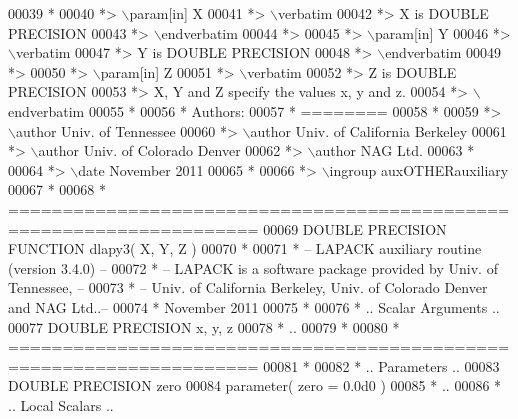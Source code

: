 \begin{DoxyCode}
00039 \textcolor{comment}{*}
00040 \textcolor{comment}{*> \(\backslash\)param[in] X}
00041 \textcolor{comment}{*> \(\backslash\)verbatim}
00042 \textcolor{comment}{*>          X is DOUBLE PRECISION}
00043 \textcolor{comment}{*> \(\backslash\)endverbatim}
00044 \textcolor{comment}{*>}
00045 \textcolor{comment}{*> \(\backslash\)param[in] Y}
00046 \textcolor{comment}{*> \(\backslash\)verbatim}
00047 \textcolor{comment}{*>          Y is DOUBLE PRECISION}
00048 \textcolor{comment}{*> \(\backslash\)endverbatim}
00049 \textcolor{comment}{*>}
00050 \textcolor{comment}{*> \(\backslash\)param[in] Z}
00051 \textcolor{comment}{*> \(\backslash\)verbatim}
00052 \textcolor{comment}{*>          Z is DOUBLE PRECISION}
00053 \textcolor{comment}{*>          X, Y and Z specify the values x, y and z.}
00054 \textcolor{comment}{*> \(\backslash\)endverbatim}
00055 \textcolor{comment}{*}
00056 \textcolor{comment}{*  Authors:}
00057 \textcolor{comment}{*  ========}
00058 \textcolor{comment}{*}
00059 \textcolor{comment}{*> \(\backslash\)author Univ. of Tennessee }
00060 \textcolor{comment}{*> \(\backslash\)author Univ. of California Berkeley }
00061 \textcolor{comment}{*> \(\backslash\)author Univ. of Colorado Denver }
00062 \textcolor{comment}{*> \(\backslash\)author NAG Ltd. }
00063 \textcolor{comment}{*}
00064 \textcolor{comment}{*> \(\backslash\)date November 2011}
00065 \textcolor{comment}{*}
00066 \textcolor{comment}{*> \(\backslash\)ingroup auxOTHERauxiliary}
00067 \textcolor{comment}{*}
00068 \textcolor{comment}{*  =====================================================================}
00069 \textcolor{keyword}{      DOUBLE PRECISION }\textcolor{keyword}{FUNCTION }dlapy3( X, Y, Z )
00070 \textcolor{comment}{*}
00071 \textcolor{comment}{*  -- LAPACK auxiliary routine (version 3.4.0) --}
00072 \textcolor{comment}{*  -- LAPACK is a software package provided by Univ. of Tennessee,    --}
00073 \textcolor{comment}{*  -- Univ. of California Berkeley, Univ. of Colorado Denver and NAG Ltd..--}
00074 \textcolor{comment}{*     November 2011}
00075 \textcolor{comment}{*}
00076 \textcolor{comment}{*     .. Scalar Arguments ..}
00077       \textcolor{keywordtype}{DOUBLE PRECISION}   x, y, z
00078 \textcolor{comment}{*     ..}
00079 \textcolor{comment}{*}
00080 \textcolor{comment}{*  =====================================================================}
00081 \textcolor{comment}{*}
00082 \textcolor{comment}{*     .. Parameters ..}
00083       \textcolor{keywordtype}{DOUBLE PRECISION}   zero
00084       parameter( zero = 0.0d0 )
00085 \textcolor{comment}{*     ..}
00086 \textcolor{comment}{*     .. Local Scalars ..}

\end{DoxyCode}
